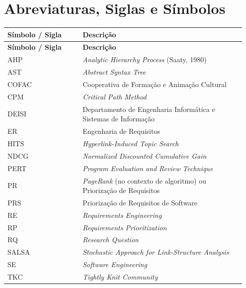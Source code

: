 \chapter*{Abreviaturas, Siglas e Símbolos}

\begin{longtable}{@{}p{0.30\linewidth} p{0.65\linewidth}@{}}
\toprule
\textbf{Símbolo / Sigla} & \textbf{Descrição} \\
\midrule
\endfirsthead
\toprule
\textbf{Símbolo / Sigla} & \textbf{Descrição} \\
\midrule
\endhead

AHP        & \emph{Analytic Hierarchy Process} (Saaty, 1980) \\
AST        & \emph{Abstract Syntax Tree} \\
COFAC      & Cooperativa de Formação e Animação Cultural \\
CPM        & \emph{Critical Path Method} \\
DEISI      & Departamento de Engenharia Informática e Sistemas de Informação \\
ER         & Engenharia de Requisitos \\
HITS       & \emph{Hyperlink-Induced Topic Search} \\
NDCG       & \emph{Normalized Discounted Cumulative Gain} \\
PERT       & \emph{Program Evaluation and Review Technique} \\
PR         & \emph{PageRank} (no contexto de algoritmo) ou Priorização de Requisitos \\
PRS        & Priorização de Requisitos de Software \\
RE         & \emph{Requirements Engineering} \\
RP         & \emph{Requirements Prioritization} \\
RQ         & \emph{Research Question} \\
SALSA      & \emph{Stochastic Approach for Link-Structure Analysis} \\
SE         & \emph{Software Engineering} \\
TKC        & \emph{Tightly Knit Community} \\[4pt]


\end{longtable}
